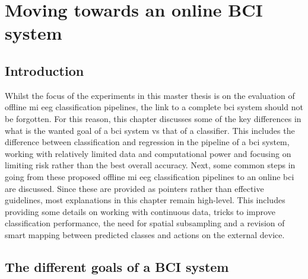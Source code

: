 







\chapter{Moving towards an online BCI system}
\label{ch:online_bci_system}


\section{Introduction}
\label{sec:online_bci_system_introduction}

Whilst the focus of the experiments in this master thesis is on the evaluation of offline \gls{mi} \gls{eeg} classification pipelines, the link to a complete \gls{bci} system should not be forgotten.
For this reason, this chapter discusses some of the key differences in what is the wanted goal of a \gls{bci} system vs that of a classifier.
This includes the difference between classification and regression in the pipeline of a \gls{bci} system, working with relatively limited data and computational power and focusing on limiting risk rather than the best overall accuracy.
Next, some common steps in going from these proposed offline \gls{mi} \gls{eeg} classification pipelines to an online \gls{bci} are discussed.
Since these are provided as pointers rather than effective guidelines, most explanations in this chapter remain high-level.
This includes providing some details on working with continuous data, tricks to improve classification performance, the need for spatial subsampling and a revision of smart mapping between predicted classes and actions on the external device.


\section{The different goals of a BCI system}
\label{sec:online_bci_system_different_goal}


